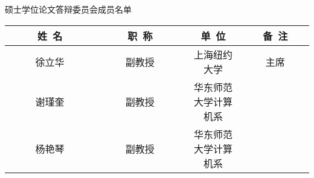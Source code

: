 \newpage
\thispagestyle{empty}
\vspace*{2em}

\begin{center}\STSong{}
 \underline{\makebox[4em][c]{\ccauthor}} 硕士学位论文答辩委员会成员名单
\end{center}

\begin{center}
\renewcommand{\arraystretch}{1.4}
\begin{tabular}{|c|c|c|c|} \hline
~~~~~姓~名~~~~~ & ~~~~~职~称~~~~~ & \hspace{6em}单~位\hspace{6em} & ~~~备~注~~~\\
\hline
  徐立华 & 副教授 & 上海纽约大学    & 主席  \\ \hline
  谢瑾奎 & 副教授 & 华东师范大学计算机系    &       \\ \hline
  杨艳琴 & 副教授 & 华东师范大学计算机系    &       \\ \hline
\end{tabular}
\end{center}
